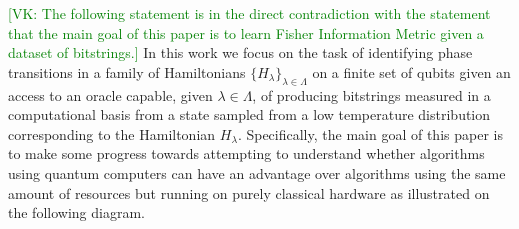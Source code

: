 \documentclass[american,aps,pra,reprint,floatfix,nofootinbib,superscriptaddress]{revtex4-2}
\newcommand{\VK}[1]{\textcolor{green}{[VK: #1]}}
\begin{document}
\VK{The following statement is in the direct contradiction with the statement
that the main goal of this paper is to learn Fisher Information Metric
given a dataset of bitstrings.}
In this work we focus on the task of identifying phase transitions in a
family of Hamiltonians $\{H_{\lambda}\}_{\lambda \in \Lambda}$ on a finite
set of qubits given an access to an oracle capable, given $\lambda \in \Lambda$,
of producing bitstrings measured in a computational basis from a state sampled
from a low temperature distribution corresponding to the Hamiltonian
$H_{\lambda}$. Specifically, the main goal of this paper is to make some
progress towards attempting to understand whether algorithms using
quantum computers can have an advantage over algorithms using the
same amount of resources but running on
purely classical hardware as illustrated on the following diagram.
\begin{center}
  \pgfmathparse{\columnwidth/13cm}%
  \edef\tikzscale{\pgfmathresult}%
\end{center}
\end{document}

